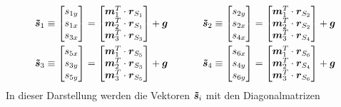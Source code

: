 \begin{equation}
\begin{split}
\boldsymbol{\tilde{s}}_1 \equiv \begin{bmatrix}
s_{1y} \\ s_{1x} \\ s_{3x}
\end{bmatrix} = \begin{bmatrix}
\boldsymbol{m}^T_1 \cdot \boldsymbol{r}_{S_1} \\
\boldsymbol{m}^T_2 \cdot \boldsymbol{r}_{S_1} \\
\boldsymbol{m}^T_3 \cdot \boldsymbol{r}_{S_3}
\end{bmatrix} + \boldsymbol{g} &\hspace{35pt}
\boldsymbol{\tilde{s}}_2 \equiv \begin{bmatrix}
s_{2y} \\ s_{2x} \\ s_{4x}
\end{bmatrix} = \begin{bmatrix}
\boldsymbol{m}^T_1 \cdot \boldsymbol{r}_{S_2} \\
\boldsymbol{m}^T_2 \cdot \boldsymbol{r}_{S_2} \\
\boldsymbol{m}^T_3 \cdot \boldsymbol{r}_{S_4}
\end{bmatrix} + \boldsymbol{g}
\\
\boldsymbol{\tilde{s}}_3 \equiv \begin{bmatrix}
s_{5x} \\ s_{3y} \\ s_{5y}
\end{bmatrix} = \begin{bmatrix}
\boldsymbol{m}^T_1 \cdot \boldsymbol{r}_{S_5} \\
\boldsymbol{m}^T_2 \cdot \boldsymbol{r}_{S_3} \\
\boldsymbol{m}^T_3 \cdot \boldsymbol{r}_{S_5} 
\end{bmatrix} + \boldsymbol{g} &\hspace{35pt}
\boldsymbol{\tilde{s}}_4 \equiv \begin{bmatrix}
s_{6x} \\ s_{4y} \\ s_{6y}
\end{bmatrix} = \begin{bmatrix}
\boldsymbol{m}^T_1 \cdot \boldsymbol{r}_{S_6} \\
\boldsymbol{m}^T_2 \cdot \boldsymbol{r}_{S_4} \\
\boldsymbol{m}^T_3 \cdot \boldsymbol{r}_{S_6}
\end{bmatrix} + \boldsymbol{g}
\end{split}
\end{equation}
In dieser Darstellung werden die Vektoren $\boldsymbol{\tilde{s}}_i$ mit den Diagonalmatrizen
